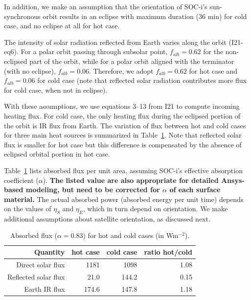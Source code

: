 \documentclass[]{aastex62}
\begin{document}
In addition, we make an assumption that the orientation of SOC-i's sun-synchronous orbit
results in an eclipse with maximum duration (36 min) for cold case, and no eclipse at all for 
hot case. 

The intensity of solar radiation reflected from Earth varies along the orbit (I21-eq6). For a polar 
orbit passing through subsolar point, $f_{alb}=0.62$ for the non-eclipsed part of the orbit, while 
for a polar orbit aligned with the terminator (with no eclipse), $f_{alb}=0.06$. Therefore, 
we adopt $f_{alb}=0.62$ for hot case and $f_{alb}=0.06$ for cold case (note that reflected solar 
radiation contributes more flux for cold case, when not in eclipse). 
 
With these assumptions, we use equations 3--13 from I21 to compute incoming heating flux.
For cold case, the only heating flux during the eclipsed portion of the orbit is IR flux from Earth. 
The variation of flux between hot and cold cases for three main heat sources is summarized in 
Table~\ref{tab:inputflux}. Note that reflected solar flux is smaller for hot case but this difference
is compensated by the absence of eclipsed orbital portion in hot case. 

Table~\ref{tab:inputflux} lists absorbed flux per unit area, assuming SOC-i's effective 
absorption coefficient ($\alpha$). {\bf The listed value are also appropriate for detailed 
Ansys-based modeling, but need to be corrected for $\alpha$ of each surface material.} 
The actual absorbed power (absorbed energy per unit time) depends on 
the values of $\eta_S$ and $\eta_E$, which in turn depend on orientation. We make additional 
assumptions about satellite orientation, as discussed next. 

\begin{table}[t]
	\centering
	\caption{Absorbed flux ($\alpha=0.83$) for hot and cold cases (in  Wm$^{-2}$). }
	\label{tab:inputflux}
	\begin{tabular}{r|r|r|r} %
		\hline
  	                    Quantity  & hot case   &   cold  case &   ratio hot/cold    \\
		\hline
              Direct solar flux    &    1181        &     1098         &     1.08       \\
           Reflected solar flux  &     21.0        &     144.2        &     0.15     \\    
                       Earth IR flux  &   174.6       &     147.8        &     1.18      \\
		\hline
	\end{tabular} 
\end{table}
\end{document}
